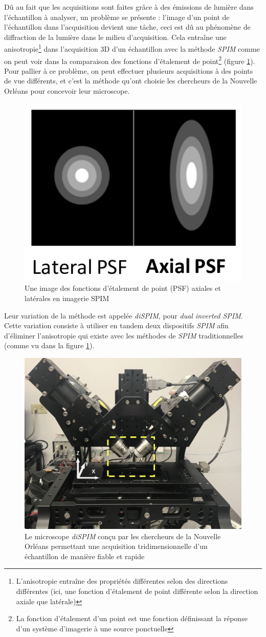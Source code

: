 \documentclass[utf8]{stageM2R}
\begin{document}
{{			Dû au fait que les acquisitions sont faites grâce à des émissions de lumière dans l'échantillon à analyser, un problème se présente : l'image d'un point de l'échantillon dans l'acquisition devient une tâche, ceci est dû au phénomène de diffraction de la lumière dans le milieu d'acquisition. Cela entraîne une anisotropie\footnote{L'anisotropie entraîne des propriétés différentes selon des directions différentes (ici, une fonction d'étalement de point différente selon la direction axiale que latérale)} dans l'acquisition 3D d'un échantillon avec la méthode \textit{SPIM} comme on peut voir dans la comparaison des fonctions d'étalement de point\footnote{La fonction d'étalement d'un point est une fonction définissant la réponse d'un système d'imagerie à une source ponctuelle\label{fn:psf}} (figure \ref{img:spim_01_point_spread_function}). Pour pallier à ce problème, on peut effectuer plusieurs acquisitions à des points de vue différents, et c'est la méthode qu'ont choisie les chercheurs de la Nouvelle Orléans pour concevoir leur microscope.\\

			\begin{figure}[!htp]
				\centering
				\includegraphics[width=0.3\linewidth]{./img/spim_01_psf.png}
				\caption{Une image des fonctions d'étalement de point (PSF) axiales et latérales en imagerie SPIM}
				\label{img:spim_01_point_spread_function}
			\end{figure}

			Leur variation de la méthode est appelée \textit{diSPIM}, pour \textit{dual inverted SPIM}. Cette variation consiste à utiliser en tandem deux dispositifs \textit{SPIM} afin d'éliminer l'anisotropie qui existe avec les méthodes de \textit{SPIM} traditionnelles (comme vu dans la figure \ref{img:spim_01_point_spread_function}).\\

			\begin{figure}[H]
				\centering
				\includegraphics[width=0.5\linewidth]{./img/lsm_device_02.png}
				\caption{Le microscope \textit{diSPIM} conçu par les chercheurs de la Nouvelle Orléans permettant une acquisition tridimensionnelle d'un échantillon de manière fiable et rapide}
				\label{lsm_02_device}
			\end{figure}

}}
\end{document}
